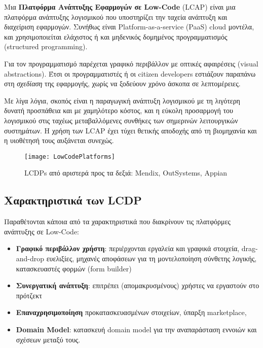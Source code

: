         Μια \textbf{Πλατφόρμα Ανάπτυξης Εφαρμογών σε Low-Code} (LCAP) είναι μια πλατφόρμα ανάπτυξης λογισμικού που υποστηρίζει την ταχεία ανάπτυξη και διαχείριση εφαρμογών. Συνήθως είναι Platform-as-a-service (PaaS) cloud μοντέλα, και χρησιμοποιείται ελάχιστος ή και μηδενικός δομημένος προγραμματισμός (structured \linebreak programming).

        Για τον προγραμματισμό παρέχεται γραφικό περιβάλλον με οπτικές αφαιρέσεις (visual abstractions). Έτσι οι προγραμματιστές ή οι citizen developers εστιάζουν παραπάνω στη \textit{σχεδίαση} της εφαρμογής, χωρίς να ξοδεύουν χρόνο άσκοπα σε λεπτομέρειες.

        Με λίγα λόγια, σκοπός είναι η παραγωγική ανάπτυξη λογισμικού με τη λιγότερη δυνατή προσπάθεια και με χαμηλότερο κόστος, και η εύκολη προσαρμογή του λογισμικού στις ταχέως μεταβαλλόμενες συνθήκες των σημερινών λειτουργικών συστημάτων. Η χρήση των LCAP έχει τύχει θετικής αποδοχής από τη βιομηχανία και η υιοθέτησή τους αυξάνεται συνεχώς. \cite{Bock2021,Bucaioni2022,Sahay2020}

        \begin{figure}[H] \noindent \centering
                \texttt{[image: LowCodePlatforms]}
                \caption{LCDPs από αριστερά προς τα δεξιά: Mendix, OutSystems, Appian \cite{LowCodeMendix}}
        \end{figure}

        \subsection{Χαρακτηριστικά των LCDP}
            Παραθέτονται κάποια από τα χαρακτηριστικά που διακρίνουν τις πλατφόρμες ανάπτυξης σε Low-Code:

            \vspace{-0.5em}
            \begin{itemize}[label={\tiny \blacksquare}]
                \setlength\itemsep{-0.25em}
                \item \textbf{Γραφικό περιβάλλον χρήστη}: περιέρχονται εργαλεία και γραφικά στοιχεία, drag-and-drop ευελιξίες, μηχανές αποφάσεων για τη μοντελοποίηση σύνθετης λογικής, κατασκευαστές φορμών (form builder)
                \item \textbf{Συνεργατική ανάπτυξη}: επιτρέπει (απομακρυσμένους) χρήστες να εργαστούν στο πρότζεκτ
                \item \textbf{Επαναχρησιμοποίηση} προκατασκευασμένων στοιχείων, ύπαρξη marketplace,
                \item \textbf{Domain Model}: κατασκευή domain model για την αναπαράσταση εννοιών και σχέσεων μεταξύ τους. \cite{MDELow}
            \end{itemize}
            \vspace{-0.5em}

